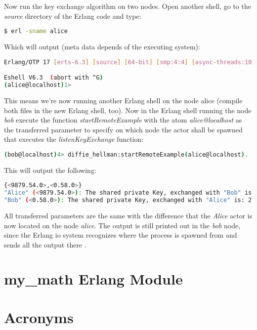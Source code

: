\documentclass[xcolor=dvipsnames]{article}
\begin{document}
\noindent Now run the key exchange algorithm on two nodes. Open another shell, go to the \textit{source} directory of the Erlang code and type:

\begin{lstlisting}[language=bash, numbers=none]
$ erl -sname alice
\end{lstlisting}

\noindent Which will output (meta data depends of the executing system):

\begin{lstlisting}[language=bash]
Erlang/OTP 17 [erts-6.3] [source] [64-bit] [smp:4:4] [async-threads:10] [hipe] [kernel-poll:false]

Eshell V6.3  (abort with ^G)
(alice@localhost)1>
\end{lstlisting}

\noindent This means we're now running another Erlang shell on the node alice (compile both files in the new Erlang shell, too). Now in the Erlang shell running the node \textit{bob} execute the function \textit{startRemoteExample} with the atom \textit{alice@localhost} as the transferred parameter to specify on which node the actor shall be spawned that executes the \textit{listenKeyExchange} function:

\begin{lstlisting}[language=bash, numbers=none]
(bob@localhost)4> diffie_hellman:startRemoteExample(alice@localhost).
\end{lstlisting}

\noindent This will output the following:

\begin{lstlisting}[language=bash, numbers=none]
{<9879.54.0>,<0.58.0>}
"Alice" (<9879.54.0>): The shared private Key, exchanged with "Bob" is: 2
"Bob" (<0.58.0>): The shared private Key, exchanged with "Alice" is: 2
\end{lstlisting}

\noindent All transferred parameters are the same with the difference that the \textit{Alice} actor is now located on the node \textit{alice}. The output is still printed out in the \textit{bob} node, since the Erlang io system recognizes where the process is spawned from and sends all the output there \cite[ch. 4.3.4 on p. 104]{erl_doc}.\\

\newpage

\begin{appendix}

\section{my\_math Erlang Module}\label{my_math}



\section{Acronyms}

\printnoidxglossaries

\end{appendix}
\end{document}
